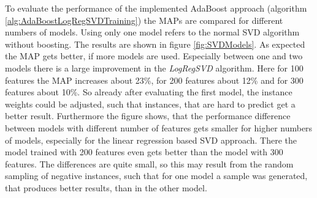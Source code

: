 \documentclass[10pt]{reportMaster}
\begin{document}
To evaluate the performance of the implemented AdaBoost approach (algorithm \ref{alg:AdaBoostLogRegSVDTraining}) the MAPs are compared for different numbers of models.
Using only one model refers to the normal SVD algorithm without boosting.
The results are shown in figure \ref{fig:SVDModels}.
As expected the MAP gets better, if more models are used.
Especially between one and two models there is a large improvement in the \textit{LogRegSVD} algorithm.
Here for 100 features the MAP increases about 23\%, for 200 features about 12\% and for 300 features about 10\%.
So already after evaluating the first model, the instance weights could be adjusted, such that instances, that are hard to predict get a better result. 
Furthermore the figure shows, that the performance difference between models with different number of features gets smaller for higher numbers of models, especially for the linear regression based SVD approach.
There the model trained with 200 features even gets better than the model with 300 features.
The differences are quite small, so this may result from the random sampling of negative instances, such that for one model a sample was generated, that produces better results, than in the other model.
\end{document}
